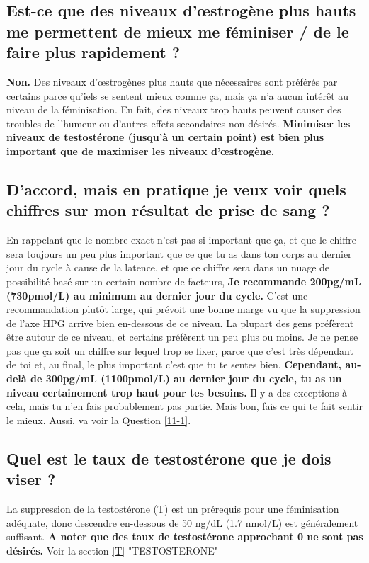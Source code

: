 \documentclass{article}
\begin{document}
\subsection{Est-ce que des niveaux d'œstrogène plus hauts me permettent de mieux me féminiser / de le faire plus rapidement ?}

\textbf{Non.} Des niveaux d'œstrogènes plus hauts que nécessaires sont préférés par certains parce qu'iels se sentent mieux comme ça, mais ça n'a aucun intérêt au niveau de la féminisation. En fait, des niveaux trop hauts peuvent causer des troubles de l'humeur ou d'autres effets secondaires non désirés. \textbf{Minimiser les niveaux de testostérone (jusqu'à un certain point) est bien plus important que de maximiser les niveaux d'œstrogène.}

\subsection{D'accord, mais en pratique je veux voir quels chiffres sur mon résultat de prise de sang ?}

En rappelant que le nombre exact n'est pas si important que ça, et que le chiffre sera toujours un peu plus important que ce que tu as dans ton corps au dernier jour du cycle à cause de la latence, et que ce chiffre sera dans un nuage de possibilité basé sur un certain nombre de facteurs, \textbf{Je recommande 200pg/mL (730pmol/L) au minimum au dernier jour du cycle.} C'est une recommandation plutôt large, qui prévoit une bonne marge vu que la suppression de l'axe HPG arrive bien en-dessous de ce niveau. La plupart des gens préfèrent être autour de ce niveau, et certains préfèrent un peu plus ou moins. Je ne pense pas que ça soit un chiffre sur lequel trop se fixer, parce que c'est très dépendant de toi et, au final, le plus important c'est que tu te sentes bien. \textbf{Cependant, au-delà de 300pg/mL (1100pmol/L) au dernier jour du cycle, tu as un niveau certainement trop haut pour tes besoins.} Il y a des exceptions à cela, mais tu n'en fais probablement pas partie. Mais bon, fais ce qui te fait sentir le mieux. Aussi, va voir la Question \ref{11-1}.

\subsection{Quel est le taux de testostérone que je dois viser ?}

La suppression de la testostérone (T) est un prérequis pour une féminisation adéquate, donc descendre en-dessous de 50 ng/dL (1.7 nmol/L) est généralement suffisant. \textbf{A noter que des taux de testostérone approchant 0 ne sont pas désirés.} Voir la section \ref{T} "TESTOSTERONE" 
\end{document}
